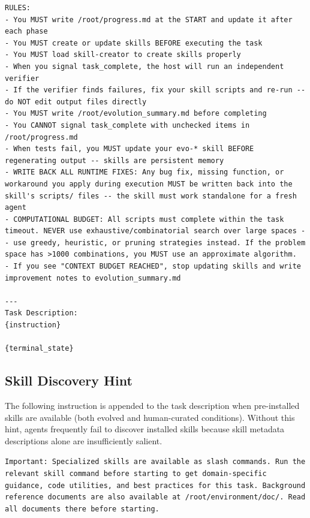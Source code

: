 \documentclass{article}
\begin{document}
\begin{tcolorbox}[colback=takeawayback, colframe=takeawayframe, title=\textbf{\texttt{Skill Generator} System Prompt (verbatim)}, fonttitle=\small, breakable]
\begin{lstlisting}
RULES:
- You MUST write /root/progress.md at the START and update it after each phase
- You MUST create or update skills BEFORE executing the task
- You MUST load skill-creator to create skills properly
- When you signal task_complete, the host will run an independent verifier
- If the verifier finds failures, fix your skill scripts and re-run -- do NOT edit output files directly
- You MUST write /root/evolution_summary.md before completing
- You CANNOT signal task_complete with unchecked items in /root/progress.md
- When tests fail, you MUST update your evo-* skill BEFORE regenerating output -- skills are persistent memory
- WRITE BACK ALL RUNTIME FIXES: Any bug fix, missing function, or workaround you apply during execution MUST be written back into the skill's scripts/ files -- the skill must work standalone for a fresh agent
- COMPUTATIONAL BUDGET: All scripts must complete within the task timeout. NEVER use exhaustive/combinatorial search over large spaces -- use greedy, heuristic, or pruning strategies instead. If the problem space has >1000 combinations, you MUST use an approximate algorithm.
- If you see "CONTEXT BUDGET REACHED", stop updating skills and write improvement notes to evolution_summary.md

---
Task Description:
{instruction}

{terminal_state}
\end{lstlisting}
\end{tcolorbox}

\subsection{Skill Discovery Hint}

The following instruction is appended to the task description when pre-installed skills are available (both evolved and human-curated conditions). Without this hint, agents frequently fail to discover installed skills because skill metadata descriptions alone are insufficiently salient.

\begin{tcolorbox}[colback=takeawayback, colframe=takeawayframe, title=\textbf{Skill Discovery Hint}, fonttitle=\small, fontupper=\small]
\texttt{Important: Specialized skills are available as slash commands. Run the relevant skill command before starting to get domain-specific guidance, code utilities, and best practices for this task. Background reference documents are also available at /root/environment/doc/. Read all documents there before starting.}
\end{tcolorbox}
\end{document}

